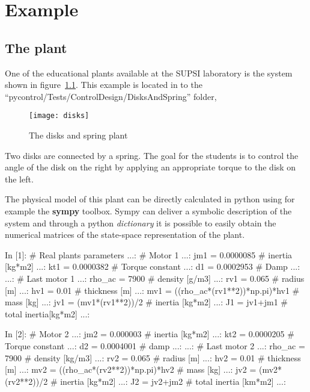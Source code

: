 \chapter{Example}
\section{The plant}

One of the educational plants available at the SUPSI laboratory is the system 
shown in figure~\ref{F20}. This example is located in to the 
``pycontrol/Tests/ControlDesign/DisksAndSpring'' folder,

\begin{figure}[htbp]	%
\centering
\texttt{[image: disks]}
\caption{The disks and spring plant}
\label{F20}
\end{figure}

Two disks are connected by a spring. The goal for the students is to control 
the angle of the disk on the right by applying an appropriate torque to the 
disk on the left.

The physical model of this plant can be directly calculated in python using for 
example the \textbf{sympy} toolbox.
Sympy can deliver a symbolic description of the system and through a python 
\textit{dictionary} it is possible to easily obtain the numerical matrices of 
the state-space representation of the plant.

\begin{code}
In [1]: # Real plants parameters
   ...: # Motor 1
   ...: jm1 = 0.0000085  # inertia [kg*m2]
   ...: kt1 = 0.0000382  # Torque constant
   ...: d1 = 0.0002953  # Damp
   ...: 
   ...: # Last motor 1
   ...: rho_ac = 7900  # density [g/m3]
   ...: rv1 = 0.065    # radius [m] 
   ...: hv1 = 0.01     # thickness [m]
   ...: mv1 = ((rho_ac*(rv1**2))*np.pi)*hv1   # mass [kg]
   ...: jv1 = (mv1*(rv1**2))/2   # inertia [kg*m2]
   ...: J1 = jv1+jm1   # total inertia[kg*m2]
   ...: 
\end{code}

\begin{code}
In [2]: # Motor 2
   ...: jm2 = 0.000003   # inertia [kg*m2]
   ...: kt2 = 0.0000205  # Torque constant
   ...: d2 = 0.0004001 # damp
   ...: 
   ...: # Last motor 2
   ...: rho_ac = 7900   # density [kg/m3]
   ...: rv2 = 0.065     # radius [m] 
   ...: hv2 = 0.01      # thickness [m]
   ...: mv2 = ((rho_ac*(rv2**2))*np.pi)*hv2   # mass [kg]
   ...: jv2 = (mv2*(rv2**2))/2              # inertia [kg*m2]
   ...: J2 = jv2+jm2                   # total inertia [km*m2]
   ...: 
\end{code}

